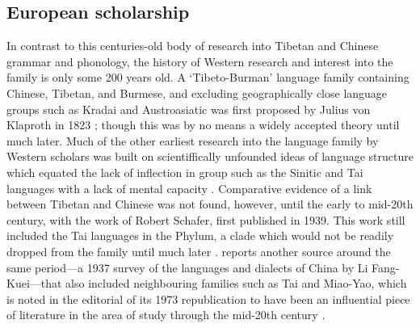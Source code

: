 \subsection{European scholarship}
In contrast to this centuries-old body of research into Tibetan and Chinese grammar and phonology, the history of Western research and interest into the family is only some 200 years old. A `Tibeto-Burman' language family containing Chinese, Tibetan, and Burmese, and excluding geographically close language groups such as Kradai and Austroasiatic was first proposed by Julius von Klaproth in 1823 \cite[12]{VanDriem2014}; though this was by no means a widely accepted theory until much later. Much of the other earliest research into the language family by Western scholars was built on scientiffically unfounded ideas of language structure which equated the lack of inflection in group such as the Sinitic and Tai languages with a lack of mental capacity \cite[13]{VanDriem2014}. Comparative evidence of a link between Tibetan and Chinese was not found, however, until the early to mid-20th century, with the work of Robert Schafer, first published in 1939. This work still included the Tai languages in the Phylum, a clade which would not be readily dropped from the family until much later \cite{Matisoff1991}.  reports another source around the same period---a 1937 survey of the languages and dialects of China by Li Fang-Kuei---that also included neighbouring families such as Tai and Miao-Yao, which is noted in the editorial of its 1973 republication to have been an influential piece of literature in the area of study through the mid-20th century \cite{Li1973}.

